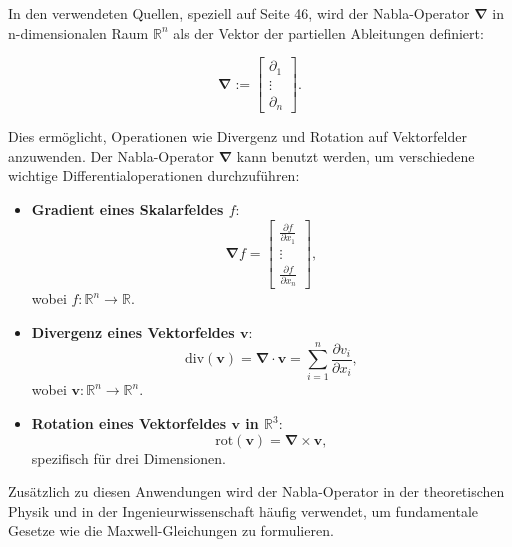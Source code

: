 \documentclass[a4paper,12pt]{article}
\begin{document}
\noindent
In den verwendeten Quellen, speziell auf Seite 46, wird der Nabla-Operator $\boldsymbol{\nabla}$ in n-dimensionalen Raum $\mathbb{R}^n$ als der Vektor der partiellen Ableitungen definiert:

\[
\boldsymbol{\nabla} := \begin{bmatrix}
\partial_1 \\
\vdots \\
\partial_n
\end{bmatrix}.
\]

Dies ermöglicht, Operationen wie Divergenz und Rotation auf Vektorfelder anzuwenden. Der Nabla-Operator $\boldsymbol{\nabla}$ kann benutzt werden, um verschiedene wichtige Differentialoperationen durchzuführen:

\begin{itemize}
    \item \textbf{Gradient eines Skalarfeldes $f$}: 
    \[
    \boldsymbol{\nabla} f = \begin{bmatrix}
    \frac{\partial f}{\partial x_1} \\
    \vdots \\
    \frac{\partial f}{\partial x_n}
    \end{bmatrix},
    \]
    wobei $f: \mathbb{R}^n \to \mathbb{R}$.
    
    \item \textbf{Divergenz eines Vektorfeldes $\mathbf{v}$}:
    \[
    \text{div}(\mathbf{v}) = \boldsymbol{\nabla} \cdot \mathbf{v} = \sum_{i=1}^n \frac{\partial v_i}{\partial x_i},
    \]
    wobei $\mathbf{v}: \mathbb{R}^n \to \mathbb{R}^n$.
    
    \item \textbf{Rotation eines Vektorfeldes $\mathbf{v}$ in $\mathbb{R}^3$}:
    \[
    \text{rot}(\mathbf{v}) = \boldsymbol{\nabla} \times \mathbf{v},
    \]
    spezifisch für drei Dimensionen.
\end{itemize}

Zusätzlich zu diesen Anwendungen wird der Nabla-Operator in der theoretischen Physik und in der Ingenieurwissenschaft häufig verwendet, um fundamentale Gesetze wie die Maxwell-Gleichungen zu formulieren.
\end{document}
